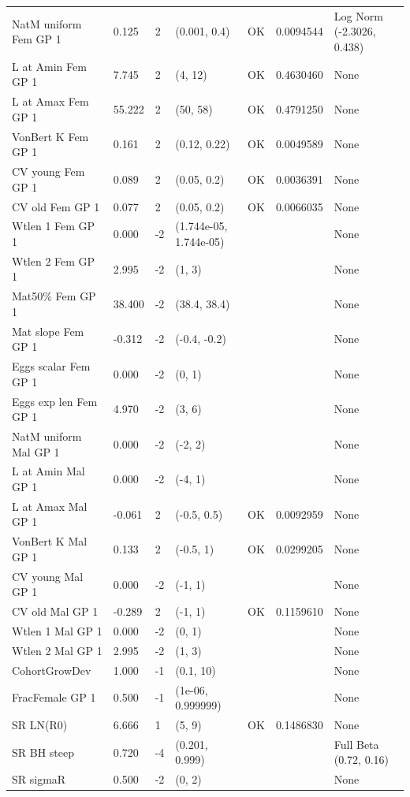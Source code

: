 \documentclass[11pt,
  english,
  a4paper,
]{article}
\begin{document}
\begin{landscape}
\begin{longtable}[t]{>{\raggedright\arraybackslash}p{8.5cm}lllll>{\raggedright\arraybackslash}p{4cm}}
\endfoot
\bottomrule
\endlastfoot
NatM uniform Fem GP 1 & 0.125 & 2 & (0.001, 0.4) & OK & 0.0094544 & Log Norm (-2.3026, 0.438)\\
L at Amin Fem GP 1 & 7.745 & 2 & (4, 12) & OK & 0.4630460 & None\\
L at Amax Fem GP 1 & 55.222 & 2 & (50, 58) & OK & 0.4791250 & None\\
VonBert K Fem GP 1 & 0.161 & 2 & (0.12, 0.22) & OK & 0.0049589 & None\\
CV young Fem GP 1 & 0.089 & 2 & (0.05, 0.2) & OK & 0.0036391 & None\\
CV old Fem GP 1 & 0.077 & 2 & (0.05, 0.2) & OK & 0.0066035 & None\\
Wtlen 1 Fem GP 1 & 0.000 & -2 & (1.744e-05, 1.744e-05) &  &  & None\\
Wtlen 2 Fem GP 1 & 2.995 & -2 & (1, 3) &  &  & None\\
Mat50\% Fem GP 1 & 38.400 & -2 & (38.4, 38.4) &  &  & None\\
Mat slope Fem GP 1 & -0.312 & -2 & (-0.4, -0.2) &  &  & None\\
Eggs scalar Fem GP 1 & 0.000 & -2 & (0, 1) &  &  & None\\
Eggs exp len Fem GP 1 & 4.970 & -2 & (3, 6) &  &  & None\\
NatM uniform Mal GP 1 & 0.000 & -2 & (-2, 2) &  &  & None\\
L at Amin Mal GP 1 & 0.000 & -2 & (-4, 1) &  &  & None\\
L at Amax Mal GP 1 & -0.061 & 2 & (-0.5, 0.5) & OK & 0.0092959 & None\\
VonBert K Mal GP 1 & 0.133 & 2 & (-0.5, 1) & OK & 0.0299205 & None\\
CV young Mal GP 1 & 0.000 & -2 & (-1, 1) &  &  & None\\
CV old Mal GP 1 & -0.289 & 2 & (-1, 1) & OK & 0.1159610 & None\\
Wtlen 1 Mal GP 1 & 0.000 & -2 & (0, 1) &  &  & None\\
Wtlen 2 Mal GP 1 & 2.995 & -2 & (1, 3) &  &  & None\\
CohortGrowDev & 1.000 & -1 & (0.1, 10) &  &  & None\\
FracFemale GP 1 & 0.500 & -1 & (1e-06, 0.999999) &  &  & None\\
SR LN(R0) & 6.666 & 1 & (5, 9) & OK & 0.1486830 & None\\
SR BH steep & 0.720 & -4 & (0.201, 0.999) &  &  & Full Beta (0.72, 0.16)\\
SR sigmaR & 0.500 & -2 & (0, 2) &  &  & None\\

\end{longtable}
\end{landscape}
\end{document}

